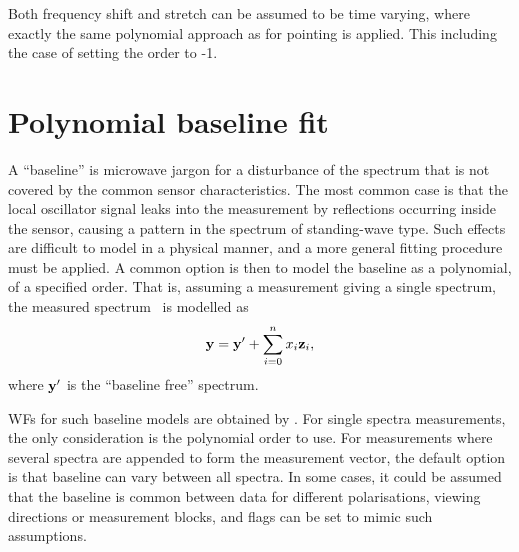 Both frequency shift and stretch can be assumed to be time varying, where
exactly the same polynomial approach as for pointing is applied. This
including the case of setting the order to -1.



\section{Polynomial baseline fit}
\label{sec:wfuns:polyfit}

A ``baseline'' is microwave jargon for a disturbance of the spectrum that is
not covered by the common sensor characteristics. The most common case is that
the local oscillator signal leaks into the measurement by reflections occurring
inside the sensor, causing a pattern in the spectrum of standing-wave type.
Such effects are difficult to model in a physical manner, and a more general
fitting procedure must be applied. A common option is then to model the
baseline as a polynomial, of a specified order. That is, assuming a measurement
giving a single spectrum, the measured spectrum \MsrVct\ is modelled as
\begin{equation}
  \label{eq:polyfit}
  \mathbf{y} = \mathbf{y}' + \sum_{i=0}^n x_i\mathbf{z}_i,
\end{equation}
where $\mathbf{y}'$ is the ``baseline free'' spectrum.

WFs for such baseline models are obtained by . For
single spectra measurements, the only consideration is the polynomial order to
use. For measurements where several spectra are appended to form the measurement
vector, the default option is that baseline can vary between all spectra. In
some cases, it could be assumed that the baseline is common between data for
different polarisations, viewing directions or measurement blocks, and flags
can be set to mimic such assumptions.



